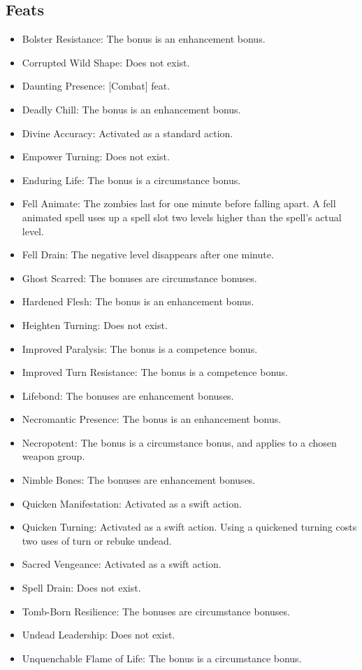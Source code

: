 \subsection{Feats}
\begin{itemize}
\item Bolster Resistance: The bonus is an enhancement bonus.
\item Corrupted Wild Shape: Does not exist.
\item Daunting Presence: [Combat] feat.
\item Deadly Chill: The bonus is an enhancement bonus.
\item Divine Accuracy: Activated as a standard action.
\item Empower Turning: Does not exist.
\item Enduring Life: The bonus is a circumstance bonus.
\item Fell Animate: The zombies last for one minute before falling apart. A fell animated spell uses up a spell slot two levels higher than the spell's actual level.
\item Fell Drain: The negative level disappears after one minute.
\item Ghost Scarred: The bonuses are circumstance bonuses.
\item Hardened Flesh: The bonus is an enhancement bonus.
\item Heighten Turning: Does not exist.
\item Improved Paralysis: The bonus is a competence bonus.
\item Improved Turn Resistance: The bonus is a competence bonus.
\item Lifebond: The bonuses are enhancement bonuses.
\item Necromantic Presence: The bonus is an enhancement bonus.
\item Necropotent: The bonus is a circumstance bonus, and applies to a chosen weapon group.
\item Nimble Bones: The bonuses are enhancement bonuses.
\item Quicken Manifestation: Activated as a swift action.
\item Quicken Turning: Activated as a swift action. Using a quickened turning costs two uses of turn or rebuke undead.
\item Sacred Vengeance: Activated as a swift action.
\item Spell Drain: Does not exist.
\item Tomb-Born Resilience: The bonuses are circumstance bonuses.
\item Undead Leadership: Does not exist.
\item Unquenchable Flame of Life: The bonus is a circumstance bonus.
\end{itemize}

